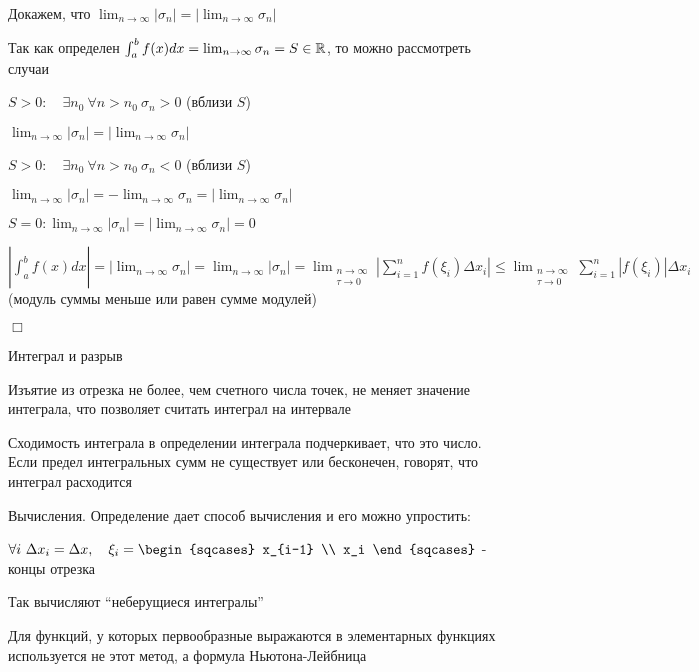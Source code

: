 \documentclass[12pt]{article}
\begin{document}
\begin{enumerate}
        Докажем, что $\lim_{n\to\infty} |\sigma_n| = |\lim_{n\to\infty} \sigma_n|$

        Так как определен $\int^b_a f(x)dx = \lim_{n\to\infty} \sigma_n = S \in \mathbb{R}$, то можно рассмотреть случаи

        $S > 0: \quad \exists n_0 \ \forall n > n_0 \ \sigma_n > 0$ (вблизи $S$)

        $\lim_{n\to\infty} |\sigma_n| = |\lim_{n\to\infty} \sigma_n|$

        $S > 0: \quad \exists n_0 \ \forall n > n_0 \ \sigma_n < 0$ (вблизи $S$)

        $\lim_{n\to\infty} |\sigma_n| = -\lim_{n\to\infty} \sigma_n = |\lim_{n\to\infty} \sigma_n|$

        $S = 0: \lim_{n\to\infty} |\sigma_n| = |\lim_{n\to\infty} \sigma_n| = 0$

        $\left| \int^b_a f(x)dx \left| = |\lim_{n\to\infty} \sigma_n| = \lim_{n\to\infty} |\sigma_n| =
        \lim_{\substack{n\to\infty \\ \tau\to0}} \left|\sum_{i=1}^n f(\xi_i) \Delta x_i\right| \leq \lim_{\substack{n\to\infty \\ \tau\to0}} \sum_{i=1}^n |f(\xi_i)| \Delta x_i$ (модуль суммы меньше или равен сумме модулей)

        $\Box$

    \end{enumerate}

    \Nota Интеграл и разрыв

    Изъятие из отрезка не более, чем счетного числа точек, не меняет значение интеграла, что позволяет считать интеграл на интервале

    \Nota Сходимость интеграла в определении интеграла подчеркивает, что это число.
    Если предел интегральных сумм не существует или бесконечен, говорят, что интеграл расходится

    \Nota Вычисления. Определение дает способ вычисления и его можно упростить:

    $\forall i\ \Delta x_i = \Delta x, \quad \xi_i = \begin{sqcases}
                                                         x_{i-1} \\ x_i
    \end{sqcases}$ - концы отрезка

    Так вычисляют \enquote{неберущиеся интегралы}

    Для функций, у которых первообразные выражаются в элементарных функциях используется не этот метод, а формула Ньютона-Лейбница
\end{document}
